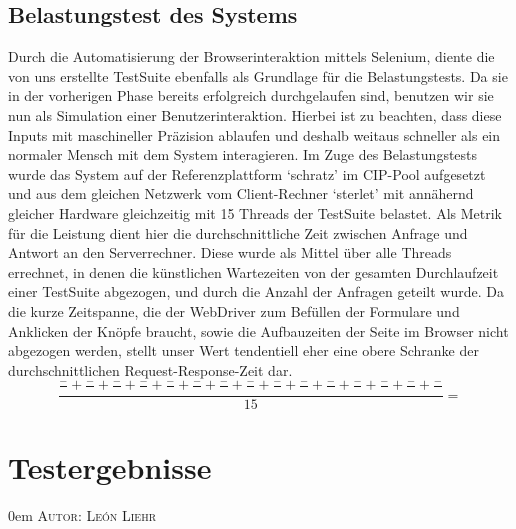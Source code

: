 \documentclass{article}
\makeatletter
\newcommand{\sectionauthor}[1]{
	{\parindent 0em \large \scshape Autor: #1 \par \nobreak \vspace*{1em}}
	\@afterheading
}
\makeatother
\begin{document}
\subsection{Belastungstest des Systems}
Durch die Automatisierung der Browserinteraktion mittels Selenium, diente die von uns erstellte TestSuite ebenfalls als Grundlage für die Belastungstests. Da sie in der vorherigen Phase bereits erfolgreich durchgelaufen sind, benutzen wir sie nun als Simulation einer Benutzerinteraktion. Hierbei ist zu beachten, dass diese Inputs mit maschineller Präzision ablaufen und deshalb weitaus schneller als ein normaler Mensch mit dem System interagieren. Im Zuge des Belastungstests wurde das System auf der Referenzplattform `schratz' im CIP-Pool aufgesetzt und aus dem gleichen Netzwerk vom Client-Rechner `sterlet'  mit annähernd gleicher Hardware gleichzeitig mit 15 Threads der TestSuite belastet. Als Metrik für die Leistung dient hier die durchschnittliche Zeit zwischen Anfrage und Antwort an den Serverrechner. Diese wurde als Mittel über alle Threads errechnet, in denen die künstlichen Wartezeiten von der gesamten Durchlaufzeit einer TestSuite abgezogen, und durch die Anzahl der Anfragen geteilt wurde. Da die kurze Zeitspanne, die der WebDriver zum Befüllen der Formulare und Anklicken der Knöpfe braucht, sowie die Aufbauzeiten der Seite im Browser nicht abgezogen werden, stellt unser Wert tendentiell eher eine obere Schranke der durchschnittlichen Request-Response-Zeit dar.
\begin{equation}
\frac{\frac{-}{} + \frac{-}{} + \frac{-}{} + \frac{-}{} + \frac{-}{} + \frac{-}{} + \frac{-}{} + \frac{-}{} + \frac{-}{} + \frac{-}{} + \frac{-}{} + \frac{-}{} + \frac{-}{} + \frac{-}{} + \frac{-}{}}{15}=
\end{equation}

\newpage

\section{Testergebnisse}
\sectionauthor{León Liehr}



\newpage

\end{document}
